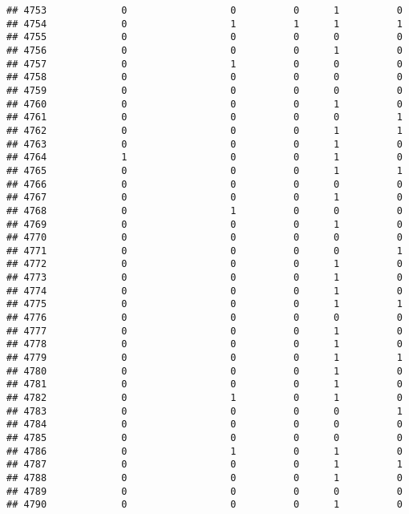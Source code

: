 \documentclass[
]{article}
\begin{document}
\begin{verbatim}
## 4753             0                  0          0      1          0
## 4754             0                  1          1      1          1
## 4755             0                  0          0      0          0
## 4756             0                  0          0      1          0
## 4757             0                  1          0      0          0
## 4758             0                  0          0      0          0
## 4759             0                  0          0      0          0
## 4760             0                  0          0      1          0
## 4761             0                  0          0      0          1
## 4762             0                  0          0      1          1
## 4763             0                  0          0      1          0
## 4764             1                  0          0      1          0
## 4765             0                  0          0      1          1
## 4766             0                  0          0      0          0
## 4767             0                  0          0      1          0
## 4768             0                  1          0      0          0
## 4769             0                  0          0      1          0
## 4770             0                  0          0      0          0
## 4771             0                  0          0      0          1
## 4772             0                  0          0      1          0
## 4773             0                  0          0      1          0
## 4774             0                  0          0      1          0
## 4775             0                  0          0      1          1
## 4776             0                  0          0      0          0
## 4777             0                  0          0      1          0
## 4778             0                  0          0      1          0
## 4779             0                  0          0      1          1
## 4780             0                  0          0      1          0
## 4781             0                  0          0      1          0
## 4782             0                  1          0      1          0
## 4783             0                  0          0      0          1
## 4784             0                  0          0      0          0
## 4785             0                  0          0      0          0
## 4786             0                  1          0      1          0
## 4787             0                  0          0      1          1
## 4788             0                  0          0      1          0
## 4789             0                  0          0      0          0
## 4790             0                  0          0      1          0

\end{verbatim}
\end{document}
